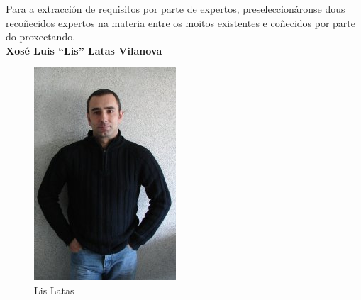   Para a extracción de requisitos por parte de expertos, preseleccionáronse
  dous recoñecidos expertos na materia entre os moitos existentes e coñecidos
  por parte do proxectando. \\

  \textbf{Xosé Luis ``Lis'' Latas Vilanova}

  \begin{figure}[htbp]
   \centering
   \includegraphics[keepaspectratio=true]{./imagenes/lis-latas.jpg}
   \caption{Lis Latas}
   \label{figura:LisLatas}
  \end{figure}

